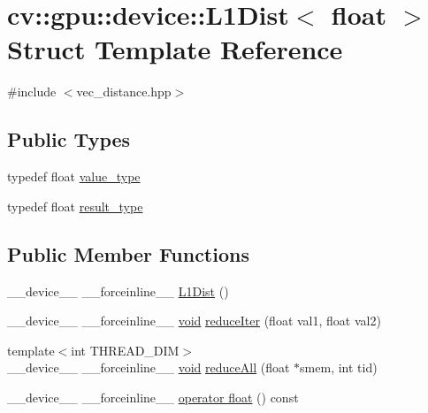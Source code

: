 \hypertarget{structcv_1_1gpu_1_1device_1_1L1Dist_3_01float_01_4}{\section{cv\-:\-:gpu\-:\-:device\-:\-:L1\-Dist$<$ float $>$ Struct Template Reference}
\label{structcv_1_1gpu_1_1device_1_1L1Dist_3_01float_01_4}
}


{\ttfamily \#include $<$vec\-\_\-distance.\-hpp$>$}

\subsection*{Public Types}
\begin{DoxyCompactItemize}
\item 
typedef float \hyperlink{structcv_1_1gpu_1_1device_1_1L1Dist_3_01float_01_4_ac97bce7e8af244bd4ea72d5cec508df1}{value\-\_\-type}
\item 
typedef float \hyperlink{structcv_1_1gpu_1_1device_1_1L1Dist_3_01float_01_4_a4f016b196709727ea41147bcf9d1f106}{result\-\_\-type}
\end{DoxyCompactItemize}
\subsection*{Public Member Functions}
\begin{DoxyCompactItemize}
\item 
\-\_\-\-\_\-device\-\_\-\-\_\- \-\_\-\-\_\-forceinline\-\_\-\-\_\- \hyperlink{structcv_1_1gpu_1_1device_1_1L1Dist_3_01float_01_4_a7a8e17c4b9f97dc2b19825a83cdf913d}{L1\-Dist} ()
\item 
\-\_\-\-\_\-device\-\_\-\-\_\- \-\_\-\-\_\-forceinline\-\_\-\-\_\- \hyperlink{legacy_8hpp_a8bb47f092d473522721002c86c13b94e}{void} \hyperlink{structcv_1_1gpu_1_1device_1_1L1Dist_3_01float_01_4_a4153c1194ab8258fd1ff69c7b6285caf}{reduce\-Iter} (float val1, float val2)
\item 
{\footnotesize template$<$int T\-H\-R\-E\-A\-D\-\_\-\-D\-I\-M$>$ }\\\-\_\-\-\_\-device\-\_\-\-\_\- \-\_\-\-\_\-forceinline\-\_\-\-\_\- \hyperlink{legacy_8hpp_a8bb47f092d473522721002c86c13b94e}{void} \hyperlink{structcv_1_1gpu_1_1device_1_1L1Dist_3_01float_01_4_a53ecb59b40e7ac1d3795858edd558281}{reduce\-All} (float $\ast$smem, int tid)
\item 
\-\_\-\-\_\-device\-\_\-\-\_\- \-\_\-\-\_\-forceinline\-\_\-\-\_\- \hyperlink{structcv_1_1gpu_1_1device_1_1L1Dist_3_01float_01_4_a7f686269eeee3936c6229b0ecd4a2053}{operator float} () const 
\end{DoxyCompactItemize}
